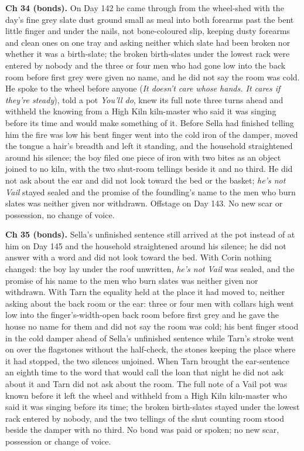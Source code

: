 \documentclass{design/chronicle}
\begin{document}
{\textbf{Ch 34 (bonds).} On Day 142 he came through from the wheel-shed with the day’s fine grey slate dust ground small as meal into both forearms past the bent little finger and under the nails, not bone-coloured slip, keeping dusty forearms and clean ones on one tray and asking neither which slate had been broken nor whether it was a birth-slate; the broken birth-slates under the lowest rack were entered by nobody and the three or four men who had gone low into the back room before first grey were given no name, and he did not say the room was cold. He spoke to the wheel before anyone (\emph{It doesn’t care whose hands. It cares if they’re steady}), told a pot \emph{You’ll do}, knew its full note three turns ahead and withheld the knowing from a High Kiln kiln-master who said it was singing before its time and would make something of it. Before Sella had finished telling him the fire was low his bent finger went into the cold iron of the damper, moved the tongue a hair’s breadth and left it standing, and the household straightened around his silence; the boy filed one piece of iron with two bites as an object joined to no kiln, with the two shut-room tellings beside it and no third. He did not ask about the ear and did not look toward the bed or the basket; \emph{he’s not Vail} stayed sealed and the promise of the foundling’s name to the men who burn slates was neither given nor withdrawn. Offstage on Day 143. No new scar or possession, no change of voice.

\textbf{Ch 35 (bonds).} Sella’s unfinished sentence still arrived at the pot instead of at him on Day 145 and the household straightened around his silence; he did not answer with a word and did not look toward the bed. With Corin nothing changed: the boy lay under the roof unwritten, \emph{he’s not Vail} was sealed, and the promise of his name to the men who burn slates was neither given nor withdrawn. With Tarn the equality held at the place it had moved to, neither asking about the back room or the ear: three or four men with collars high went low into the finger’s-width-open back room before first grey and he gave the house no name for them and did not say the room was cold; his bent finger stood in the cold damper ahead of Sella’s unfinished sentence while Tarn’s stroke went on over the flagstones without the half-check, the stones keeping the place where it had stopped, the two silences unjoined. When Tarn brought the ear-sentence an eighth time to the word that would call the loan that night he did not ask about it and Tarn did not ask about the room. The full note of a Vail pot was known before it left the wheel and withheld from a High Kiln kiln-master who said it was singing before its time; the broken birth-slates stayed under the lowest rack entered by nobody, and the two tellings of the shut counting room stood beside the damper with no third. No bond was paid or spoken; no new scar, possession or change of voice.

}
\end{document}
